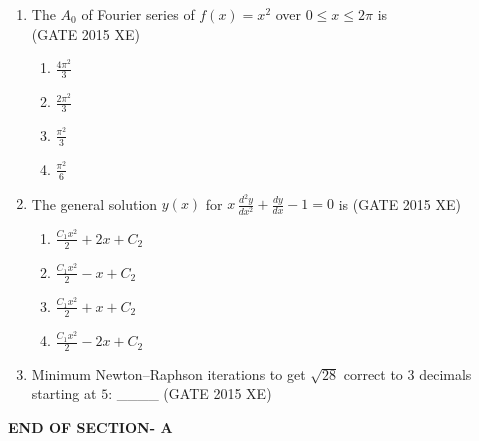 \documentclass[journal,12pt,onecolumn]{IEEEtran}
\begin{document}
\begin{enumerate}
\newpage

\item The $A_0$ of Fourier series of $f(x)=x^2$ over $0 \le x \le 2\pi$ is  \\
\hfill{(GATE 2015 XE)} 

\begin{multicols}{4}
\begin{enumerate}
\item $\frac{4\pi^2}{3}$
\item $\frac{2\pi^2}{3}$
\item $\frac{\pi^2}{3}$
\item $\frac{\pi^2}{6}$
\end{enumerate}
\end{multicols}

\item The general solution $y(x)$ for  
$x\,\frac{d^2y}{dx^2} + \frac{dy}{dx} - 1 = 0$
is  
\hfill{(GATE 2015 XE)} \\

\begin{multicols}{4}
\begin{enumerate}
\item $\frac{C_1x^2}{2} + 2x + C_2$
\item $\frac{C_1x^2}{2} - x + C_2$
\item $\frac{C_1x^2}{2} + x + C_2$
\item $\frac{C_1x^2}{2} - 2x + C_2$
\end{enumerate}
\end{multicols}


\item Minimum Newton–Raphson iterations to get $\sqrt{28}$ correct to $3$ decimals starting at $5$: \_\_\_\_
\hfill{(GATE 2015 XE)} \\

\end{enumerate}

\vspace{3\baselineskip}
\begin{center}
    \item[\textbf{END OF SECTION- A}]
\end{center}


\newpage
\end{document}
